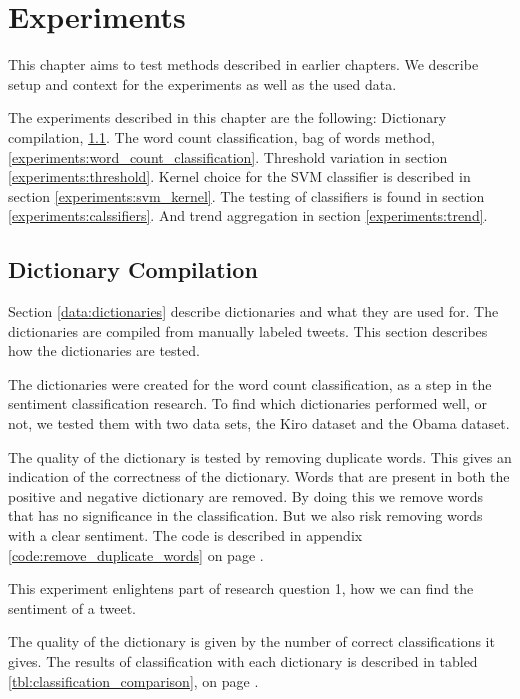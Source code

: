 \chapter{Experiments}\label{experiments}
This chapter aims to test methods described in earlier chapters. We describe
setup and context for the experiments as well as the used data.

The experiments described in this chapter are the following: Dictionary
compilation, \ref{experiments:dictionaries}. The word count classification, bag
of words method, \ref{experiments:word_count_classification}. Threshold
variation in section \ref{experiments:threshold}. Kernel choice for the SVM
classifier is described in section \ref{experiments:svm_kernel}. The
testing of classifiers is found in section \ref{experiments:calssifiers}. And
trend aggregation in section \ref{experiments:trend}.

\section{Dictionary Compilation}\label{experiments:dictionaries}
Section \ref{data:dictionaries} describe dictionaries and what they are used
for. The dictionaries are compiled from manually labeled tweets.
This section describes how the dictionaries are tested. 

The dictionaries were created for the word count classification, 
as a step in the sentiment classification research.
To find which dictionaries performed well, or not, we tested them
with two data sets, the Kiro dataset and the Obama dataset. 

The quality of the dictionary is tested by removing duplicate words. This gives
an indication of the correctness of the dictionary. 
Words that are present in both the positive and
negative dictionary are removed. By doing this we remove words that has no
significance in the classification. But we also risk removing words with a 
clear sentiment. The code is described in appendix
\ref{code:remove_duplicate_words} on page \pageref{code:remove_duplicate_words}.

This experiment enlightens part of research question 1,
how we can find the sentiment of a tweet.

The quality of the dictionary is given by the number of correct classifications
it gives. The results of classification with each dictionary is described in
tabled \ref{tbl:classification_comparison}, on page
\pageref{tbl:classification_comparison}. 

